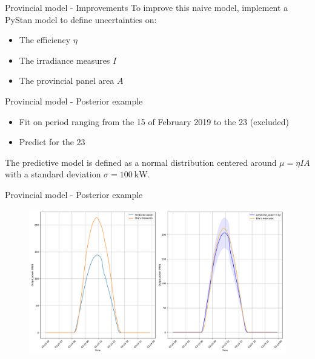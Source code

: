 \documentclass[12pt]{beamer}
\begin{document}
\begin{frame}{Provincial model - Improvements}
    To improve this naive model, implement a PyStan model to define uncertainties on:
    \begin{itemize}
        \item The efficiency $\eta$
        \item The irradiance measures $I$
        \item The provincial panel area $A$
    \end{itemize}
\end{frame}

\begin{frame}{Provincial model - Posterior example}
    \begin{itemize}
        \item Fit on period ranging from the 15 of February 2019 to the 23 (excluded)
        \item Predict for the 23
    \end{itemize}
    The predictive model is defined as a normal distribution centered around
	$\mu = \eta I A$ with a standard deviation $\sigma = \SI{100}{\kilo\watt}$.
\end{frame}

\begin{frame}{Provincial model - Posterior example}
	\begin{figure}
	    \centering
	    \includegraphics[width=.85\textwidth]{resources/pdf/comparison_naive_post.pdf}
	    \label{fig:comparison_naive_post}
	\end{figure}
\end{frame}
\end{document}
